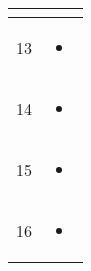 \begin{center}
\begin{longtable}{|c|p{12cm}|}
\begin{itemize}
\end{itemize}
\\ \hline
13 & 
\begin{itemize}
  \item 
\end{itemize}
\\ \hline
14 & 
\begin{itemize}
  \item 
\end{itemize}
\\ \hline
15 & 
\begin{itemize}
  \item 
\end{itemize}
\\ \hline
16 & 
\begin{itemize}
  \item 
\end{itemize}
\\ \hline
\end{longtable}
\end{center}
